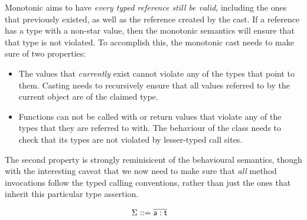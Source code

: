 \documentclass[a4paper,UKenglish,final]{tex/lipics-v2016}
\begin{document}


Monotonic aims to have \emph{every typed reference still be valid}, including the ones that previously existed, as well as the reference created by the cast. If a reference has a type with a non-star value, then the monotonic semantics will ensure that that type is not violated. To accomplish this, the monotonic cast needs to make sure of two properties:
\begin{itemize}
\item The values that \emph{currently} exist cannot violate any of the types that point to them. Casting needs to recursively ensure that all values referred to by the current object are of the claimed type.
\item Functions can not be called with or return values that violate any of the types that they are referred to with. The behaviour of the class needs to check that its types are not violated by lesser-typed call sites.
\end{itemize}
The second property is strongly reminisicent of the behavioural semantics, though with the interesting caveat that we now need to make sure that \emph{all} method invocations follow the typed calling conventions, rather than just the ones that inherit this particular type assertion.


\hrulefill

\newcommand{\rectype}[1]{\xt{recType}(#1)}
\newcommand{\htype}[1]{\xt{hType}(#1)}
\newcommand{\fieldtypes}[1]{\xt{fieldTypes}(#1)}
\newcommand{\typeof}[1]{\xt{typeOf}(#1)}
\newcommand{\classgen}[1]{\xt{classGen}(#1)}
\newcommand{\meett}[1]{\xt{meet}(#1)}


\begin{align*}
\Sigma &::= \overline{{\sf{a}}:{\sf{t}}}
\end{align*}
\end{document}
